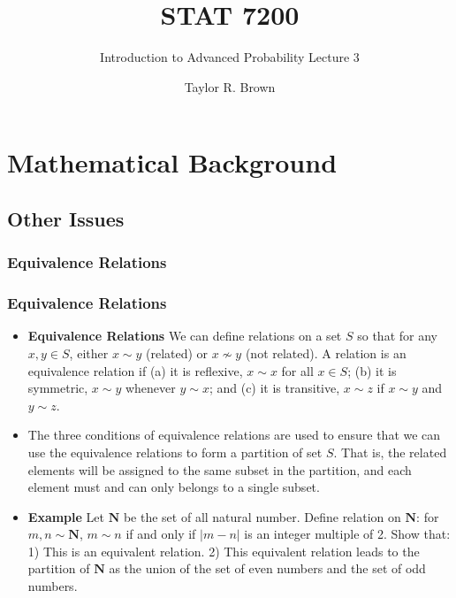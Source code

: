 \documentclass[handout]{beamer}
\title{STAT 7200}
\subtitle{Introduction to Advanced Probability \newline Lecture 3}
\author{Taylor R. Brown}
\institute{}
\date{}
\begin{document}
\frame{\titlepage}

\section[Outline]{}



\section{Mathematical Background}



\subsection{Other Issues}
\subsubsection{Equivalence Relations} 

\frame
{
  \frametitle{Equivalence Relations}

   \begin{itemize}
   
 
\item<1-> \textbf{Equivalence Relations} We can define relations on a set $S$ so that for any $x,y\in S$, either $x\sim y$ (related) or  $x\not \sim y$ (not related). A relation is an equivalence relation if (a) it is reflexive, $x\sim x$ for all $x\in S$; (b) it is symmetric, $x\sim y$ whenever $y\sim x$; and (c) it is transitive, $x\sim z$ if $x\sim y$ and $y\sim z$.
  
\item<2-> The three conditions of equivalence relations are used to ensure that we can use the equivalence relations to form a partition of set $S$. That is, the related elements will be assigned to the same subset in the partition, and each element must and can only belongs to a single subset. 
       
\item<3->  \textbf{Example } Let $\mathbf{N}$ be the set of all natural number. Define relation on $\mathbf{N}$: for $m, n \sim \mathbf{N}$,  $m \sim n$ if and only if $|m-n|$ is an integer multiple of 2.  Show that: 1) This is an equivalent relation. 2) This equivalent relation leads to the partition of $\mathbf{N}$ as the union of the set of even numbers and the set of odd numbers.        
  \end{itemize}
}
\end{document}
